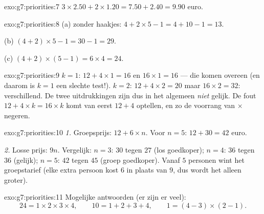 \begin{solution}{exo:g7:priorities:7}
$3 \times 2.50 + 2 \times 1.20 = 7.50 + 2.40 = 9.90$ euro.
\end{solution}

\begin{solution}{exo:g7:priorities:8}
(a) zonder haakjes: $4 + 2 \times 5 - 1 = 4 + 10 - 1 = 13$.

(b) $(4 + 2) \times 5 - 1 = 30 - 1 = 29$.

(c) $(4 + 2) \times (5 - 1) = 6 \times 4 = 24$.
\end{solution}

\begin{solution}{exo:g7:priorities:9}
$k = 1$: $12 + 4 \times 1 = 16$ en $16 \times 1 = 16$ --- die komen overeen (en
daarom is $k = 1$ een slechte test!). $k = 2$: $12 + 4 \times 2 = 20$ maar
$16 \times 2 = 32$: verschillend. De twee uitdrukkingen zijn dus in het algemeen
\emph{niet} gelijk. De fout $12 + 4 \times k = 16 \times k$ komt van eerst
$12 + 4$ optellen, en zo de voorrang van $\times$ negeren.
\end{solution}

\begin{solution}{exo:g7:priorities:10}
\emph{1.} Groepsprijs: $12 + 6 \times n$. Voor $n = 5$: $12 + 30 = 42$ euro.

\emph{2.} Losse prijs: $9n$. Vergelijk: $n = 3$: $30$ tegen $27$ (los
goedkoper); $n = 4$: $36$ tegen $36$ (gelijk); $n = 5$: $42$ tegen $45$ (groep
goedkoper). Vanaf $5$ personen wint het groepstarief (elke extra persoon kost
$6$ in plaats van $9$, dus wordt het  alleen groter).
\end{solution}

\begin{solution}{exo:g7:priorities:11}
Mogelijke antwoorden (er zijn er veel):
\[
24 = 1 \times 2 \times 3 \times 4, \qquad
10 = 1 + 2 + 3 + 4, \qquad
1 = (4 - 3) \times (2 - 1).
\]
\end{solution}

